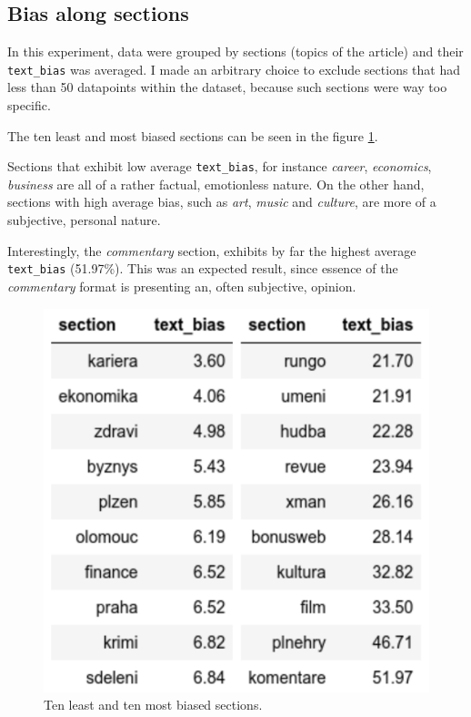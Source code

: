 \newpage
\subsection{Bias along sections}\label{commentary_bias}
In this experiment, data were grouped by sections (topics of the article) and their \verb|text_bias| was averaged. I made an arbitrary choice to exclude sections that had less than 50 datapoints within the dataset, because such sections were way too specific.

The ten least and most biased sections can be seen in the figure \ref{fig:sections}.


Sections that exhibit low average \verb|text_bias|, for instance \textit{career}, \textit{economics}, \textit{business} are all of a rather factual, emotionless nature.
On the other hand, sections with high average bias, such as \textit{art}, \textit{music} and \textit{culture}, are more of a subjective, personal nature.

Interestingly, the \textit{commentary} section, exhibits by far the highest average \verb|text_bias| (51.97\%). This was an expected result, since essence of the \textit{commentary} format is presenting an, often subjective, opinion.

\begin{figure}

  \includegraphics[scale=0.2]{my_modules/multimedia/inference/sections.jpg}
  \caption{Ten least and ten most biased sections.}
  \label{fig:sections}
\end{figure}

